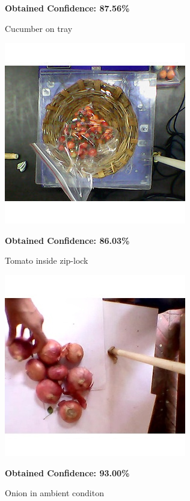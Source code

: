\documentclass[a4paper,12pt,oneside]{book}
\begin{document}
\begin{itemize}
\begin{figure}[!ht]
	  	\caption{Cucumber on tray}\textbf{ Obtained Confidence: 87.56\%}
	  	\label{fig:cucumber-tray}
	  \end{figure}
  \hfill
	  \begin{figure}[!ht]
	  	\centering
	  	\includegraphics[width=0.5\linewidth]{"tomato - ziplock"}
	  	\caption{Tomato inside zip-lock}\textbf{ Obtained Confidence: 86.03\%}
	  	\label{fig:tomato---ziplock}
	  \end{figure}
  \hfill
	  \begin{figure}[!ht]
	  	\centering
	  	\includegraphics[width=0.5\linewidth]{"onion - hand"}
	  	\caption{Onion in ambient conditon}\textbf{ Obtained Confidence: 93.00\%}
	  	\label{fig:onion---hand}
	  \end{figure}
	  
	
\end{itemize}





\end{document}
